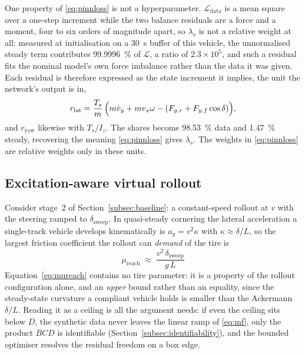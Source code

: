 One property of \eqref{eq:pinnloss} is not a hyperparameter.
$\mathcal{L}_{\mathrm{data}}$ is a mean square over a one-step increment while
the two balance residuals are a force and a moment, four to six orders of
magnitude apart, so $\lambda_{s}$ is not a relative weight at all: measured at
initialisation on a \SI{30}{\second} buffer of this vehicle, the unnormalised
steady term contributes \SI{99.9996}{\percent} of $\mathcal{L}$, a ratio of
$\num{2.3}\times10^{5}$, and such a residual fits the nominal model's own force imbalance
rather than the data it was given. Each residual is therefore expressed as the
state increment it implies, the unit the network's output is in,
\begin{equation}
r_{\mathrm{lat}}=\frac{T_{s}}{m}\,\Big(m\dot v_{y}+mv_{x}\omega-(F_{y,r}+F_{y,f}\cos\delta)\Big),
\label{eq:physnorm}
\end{equation}
and $r_{\mathrm{yaw}}$ likewise with $T_{s}/I_{z}$. The shares become
\SI{98.53}{\percent} data and \SI{1.47}{\percent} steady, recovering the meaning
\eqref{eq:pinnloss} gives $\lambda_{s}$. The weights in \eqref{eq:pinnloss} are
relative weights only in these units.

\subsection{Excitation-aware virtual rollout}
\label{subsec:excitation}

Consider stage~2 of
Section~\ref{subsec:baseline}: a constant-speed rollout at $v$ with the steering
ramped to $\delta_{\mathrm{sweep}}$. In quasi-steady cornering the lateral
acceleration a single-track vehicle develops kinematically is
$a_{y}=v^{2}\kappa$ with $\kappa\approx\delta/L$, so the largest friction
coefficient the rollout can \emph{demand} of the tire is
\begin{equation}
\boxed{\;\mu_{\mathrm{reach}}\;\approx\;\frac{v^{2}\,\delta_{\mathrm{sweep}}}{g\,L}\;}
\label{eq:mureach}
\end{equation}
Equation~\eqref{eq:mureach} contains no tire parameter: it is a property of the
rollout configuration alone, and an \emph{upper} bound rather than an equality,
since the steady-state curvature a compliant vehicle holds is smaller than the
Ackermann $\delta/L$. Reading it as a ceiling is all the argument needs: if even
the ceiling sits below $D$, the synthetic data never leaves the linear ramp of
\eqref{eq:mf}, only the product $BCD$ is identifiable
(Section~\ref{subsec:identifiability}), and the bounded optimiser resolves the
residual freedom on a box edge.

